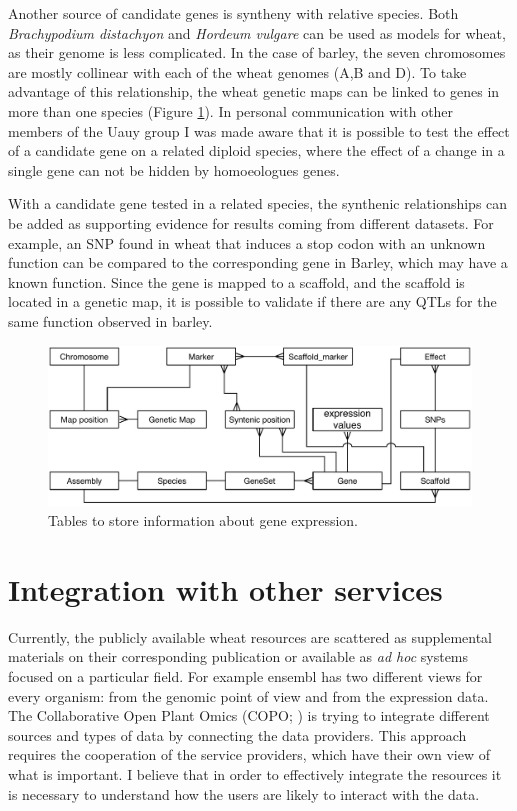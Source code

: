 Another source of candidate genes is syntheny with relative species. 
Both \textit{Brachypodium distachyon} and \textit{Hordeum vulgare} can be used as models for wheat, as their genome is less complicated. 
In the case of barley, the seven chromosomes are mostly collinear \citep{Rustenholz2010} with each of the wheat genomes (A,B and D). 
To take advantage of this relationship, the wheat genetic maps can be linked to genes in more than one species (Figure \ref{fig:discussion:MapVsExpVsSNPvsSyntheni}).
In personal communication with other members of the Uauy group I was made aware that it is possible to test the effect of a candidate gene on a related diploid species, where the effect of a change in a single gene can not be hidden by homoeologues genes. 

With a candidate gene tested in a related species, the synthenic relationships can be added as supporting evidence for results coming from different datasets. 
For example, an SNP found in wheat that induces a stop codon with an unknown function can be compared to the corresponding gene in Barley, which may have a known function. 
Since the gene is mapped to a scaffold, and the scaffold is located in a genetic map, it is possible to validate if there are any QTLs for the same function observed in barley. 

\begin{figure}
\includegraphics[width=1\textwidth]{Conclusions/Figures/MspVsExpVsSNPvsSyntheni.pdf}
\caption{Tables to store information about gene expression.}
\label{fig:discussion:MapVsExpVsSNPvsSyntheni}
\end{figure}

\section{Integration with other services}

Currently, the publicly available wheat resources are scattered as supplemental materials on their corresponding publication or available as \textit{ad hoc} systems focused on a particular field.
For example ensembl has two different views for every organism: from the genomic point of view and from the expression data. 
The Collaborative Open Plant Omics (COPO; \citealt{Davey2015}) is trying to integrate different sources and types of data by connecting the data providers. 
This approach requires the cooperation of the service providers, which have their own view of what is important. 
I believe that in order to effectively integrate the resources it is necessary to understand how the users are likely to interact with the data.

